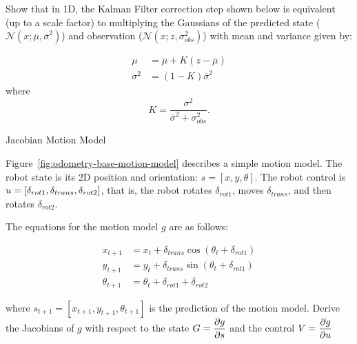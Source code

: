 \documentclass[tp]{lcc}
\begin{document}
Show that in 1D, the Kalman Filter correction step shown below is equivalent (up to a scale factor) to multiplying the Gaussians of the predicted state ($\mathcal{N}(x;\overline{\mu},\overline{\sigma}^{2})$) and observation ($\mathcal{N}(x;z, \sigma_{obs}^{2})$) with mean and variance given by:

\begin{align*}
\mu &= \overline{\mu} + K (z - \overline{\mu})\\
\sigma^{2} &= (1 - K) \overline{\sigma}^{2}
\end{align*}
%
where
\begin{equation*}
K = \dfrac{\overline{\sigma}^{2}}{\overline{\sigma}^{2}+\sigma_{obs}^{2}}.
\end{equation*}

\ejercicio Jacobian Motion Model
\label{exercise:jacobian}

Figure~\ref{fig:odometry-base-motion-model} describes a simple motion model. The robot state is its 2D position and orientation: $s = [x, y, \theta]$. The robot control is $u = [\delta_{rot1}, \delta_{trans}, \delta_{rot2}]$, that is, the robot rotates $\delta_{rot1}$, moves $\delta_{trans}$, and then rotates $\delta_{rot2}$.

The equations for the motion model $g$ are as follows:

\begin{align*}
x_{t+1} &= x_{t} + \delta_{trans} \cos(\theta_{t} + \delta_{rot1})\\
y_{t+1} &= y_{t} + \delta_{trans} \sin(\theta_{t} + \delta_{rot1})\\
\theta_{t+1} &= \theta_{t} + \delta_{rot1} + \delta_{rot2}
\end{align*}

where $s_{t+1} = [x_{t+1}, y_{t+1}, \theta_{t+1}]$ is the prediction of the motion model. Derive the Jacobians of $g$ with respect to the state $G = \dfrac{\partial g}{\partial s}$ and the control $V = \dfrac{\partial g}{\partial u}$
    
\end{document}

